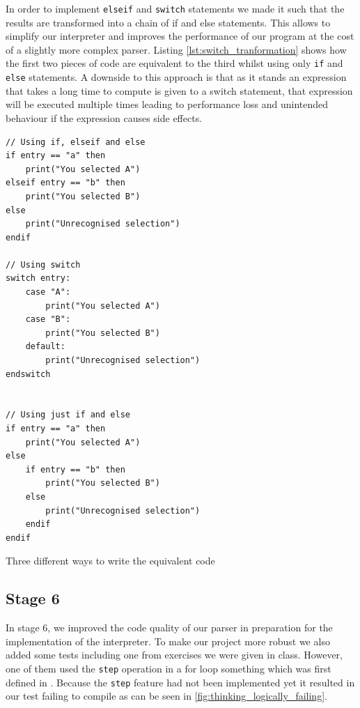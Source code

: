 \documentclass{article}
\begin{document}
In order to implement \texttt{elseif} and \texttt{switch} statements we made it
such that the results are transformed into a chain of if and else statements.
This allows to simplify our interpreter and improves the performance of our
program at the cost of a slightly more complex parser. Listing
\ref{lst:switch_tranformation} shows how the first two pieces of code are
equivalent to the third whilst using only \texttt{if} and \texttt{else}
statements. A downside to this approach is that as it stands an expression that
takes a long time to compute is given to a switch statement, that expression
will be executed multiple times leading to performance loss and unintended
behaviour if the expression causes side effects.

\begin{listing}
	\begin{verbatim}
// Using if, elseif and else
if entry == "a" then
	print("You selected A")
elseif entry == "b" then
	print("You selected B")
else
	print("Unrecognised selection")
endif

// Using switch
switch entry:
	case "A":
		print("You selected A")
	case "B":
		print("You selected B")
	default:
		print("Unrecognised selection")
endswitch


// Using just if and else
if entry == "a" then
	print("You selected A")
else
	if entry == "b" then
		print("You selected B")
	else
		print("Unrecognised selection")
	endif
endif
	\end{verbatim}
	\caption{Three different ways to write the equivalent code}
	\label{lst:switch_tranformation}
\end{listing}

\subsection{Stage 6}

In stage 6, we improved the code quality of our parser in preparation for the
implementation of the interpreter. To make our project more robust we also
added some tests including one from exercises we were given in class. However,
one of them used the \texttt{step} operation in a for loop something which was
first defined in . Because the \texttt{step} feature had not
been implemented yet it resulted in our test failing to compile as can be seen
in \autoref{fig:thinking_logically_failing}.
\end{document}
